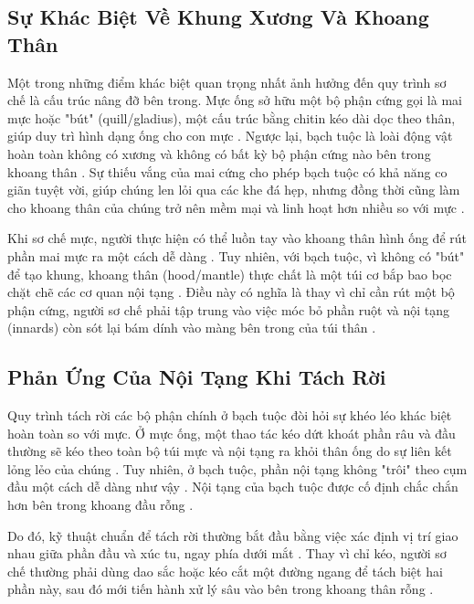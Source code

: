 \documentclass[12pt,a4paper]{report}
\begin{document}
\subsection{Sự Khác Biệt Về Khung Xương Và Khoang Thân}

Một trong những điểm khác biệt quan trọng nhất ảnh hưởng đến quy trình sơ chế là cấu trúc nâng đỡ bên trong. Mực ống sở hữu một bộ phận cứng gọi là mai mực hoặc "bút" (quill/gladius), một cấu trúc bằng chitin kéo dài dọc theo thân, giúp duy trì hình dạng ống cho con mực \cite{ref5}. Ngược lại, bạch tuộc là loài động vật hoàn toàn không có xương và không có bất kỳ bộ phận cứng nào bên trong khoang thân \cite{ref7}. Sự thiếu vắng của mai cứng cho phép bạch tuộc có khả năng co giãn tuyệt vời, giúp chúng len lỏi qua các khe đá hẹp, nhưng đồng thời cũng làm cho khoang thân của chúng trở nên mềm mại và linh hoạt hơn nhiều so với mực \cite{ref7}.

Khi sơ chế mực, người thực hiện có thể luồn tay vào khoang thân hình ống để rút phần mai mực ra một cách dễ dàng \cite{ref10}. Tuy nhiên, với bạch tuộc, vì không có "bút" để tạo khung, khoang thân (hood/mantle) thực chất là một túi cơ bắp bao bọc chặt chẽ các cơ quan nội tạng \cite{ref7}. Điều này có nghĩa là thay vì chỉ cần rút một bộ phận cứng, người sơ chế phải tập trung vào việc móc bỏ phần ruột và nội tạng (innards) còn sót lại bám dính vào màng bên trong của túi thân \cite{ref1}.

\subsection{Phản Ứng Của Nội Tạng Khi Tách Rời}

Quy trình tách rời các bộ phận chính ở bạch tuộc đòi hỏi sự khéo léo khác biệt hoàn toàn so với mực. Ở mực ống, một thao tác kéo dứt khoát phần râu và đầu thường sẽ kéo theo toàn bộ túi mực và nội tạng ra khỏi thân ống do sự liên kết lỏng lẻo của chúng \cite{ref1}. Tuy nhiên, ở bạch tuộc, phần nội tạng không "trôi" theo cụm đầu một cách dễ dàng như vậy \cite{ref1}. Nội tạng của bạch tuộc được cố định chắc chắn hơn bên trong khoang đầu rỗng \cite{ref12}.

Do đó, kỹ thuật chuẩn để tách rời thường bắt đầu bằng việc xác định vị trí giao nhau giữa phần đầu và xúc tu, ngay phía dưới mắt \cite{ref1}. Thay vì chỉ kéo, người sơ chế thường phải dùng dao sắc hoặc kéo cắt một đường ngang để tách biệt hai phần này, sau đó mới tiến hành xử lý sâu vào bên trong khoang thân rỗng \cite{ref4}.
\end{document}
